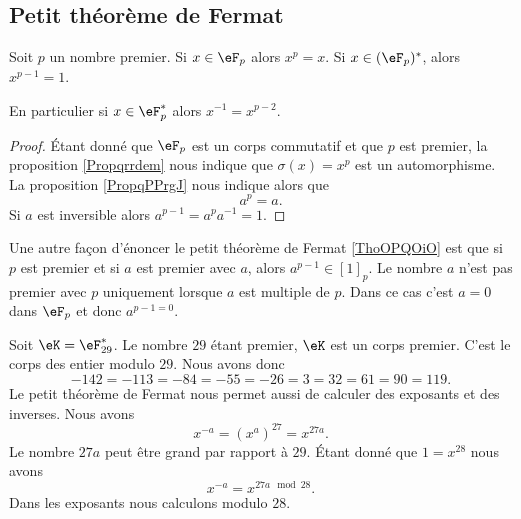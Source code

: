 \subsection{Petit théorème de Fermat}

\begin{theorem}       \label{ThoOPQOiO}   
    Soit \( p\) un nombre premier. Si \( x\in \eF_p\) alors \( x^p=x\). Si \( x\in(\eF_p)^*\), alors \( x^{p-1}=1\).

    En particulier si \( x\in \eF_p^*\) alors \( x^{-1}=x^{p-2}\).
\end{theorem}

\begin{proof}
    Étant donné que \( \eF_p\) est un corps commutatif et que \( p\) est premier, la proposition \ref{Propqrrdem} nous indique que \( \sigma(x)=x^p\) est un automorphisme. La proposition \ref{PropqPPrgJ} nous indique alors que
    \begin{equation}
        a^p=a.
    \end{equation}
    Si \( a\) est inversible alors \( a^{p-1}=a^pa^{-1}=1\).
\end{proof}

\begin{remark}      \label{RemCoSnxh}
    Une autre façon d'énoncer le petit théorème de Fermat \ref{ThoOPQOiO} est que si \( p\) est premier et si \( a\) est premier avec \( a\), alors \( a^{p-1}\in[1]_p\). Le nombre \( a\) n'est pas premier avec \( p\) uniquement lorsque \( a\) est multiple de \( p\). Dans ce cas c'est \( a=0\) dans \( \eF_p\) et donc \( a^{p-1=0}\).
\end{remark}

\begin{example}
    Soit \( \eK=\eF_{29}^*\). Le nombre \( 29\) étant premier, \( \eK\) est un corps premier. C'est le corps des entier modulo \( 29\). Nous avons donc
    \begin{equation}
            -142=-113=-84=-55=-26=3=32=61=90=119.
    \end{equation}
    Le petit théorème de Fermat nous permet aussi de calculer des exposants et des inverses. Nous avons
    \begin{equation}
        x^{-a}=(x^a)^{27}=x^{27a}.
    \end{equation}
    Le nombre \( 27 a\) peut être grand par rapport à \( 29\). Étant donné que \( 1=x^{28}\) nous avons
    \begin{equation}
        x^{-a}=x^{27 a\mod 28}.
    \end{equation}
    Dans les exposants nous calculons modulo \( 28\).
\end{example}

